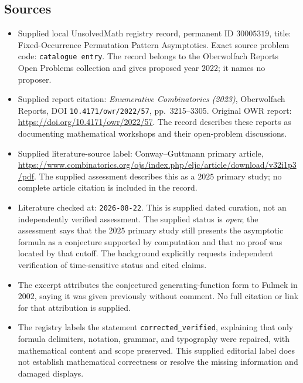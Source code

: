\documentclass[11pt]{article}
\begin{document}
\subsection{Sources}
\begin{itemize}
\item Supplied local UnsolvedMath registry record, permanent ID \(30005319\), title: Fixed-Occurrence Permutation Pattern Asymptotics. Exact source problem code: \texttt{catalogue entry}. The record belongs to the Oberwolfach Reports Open Problems collection and gives proposed year \(2022\); it names no proposer.
\item Supplied report citation: \emph{Enumerative Combinatorics (2023)}, Oberwolfach Reports, DOI \texttt{10.4171/owr/2022/57}, pp.\ 3215--3305. Original OWR report: \url{https://doi.org/10.4171/owr/2022/57}. The record describes these reports as documenting mathematical workshops and their open-problem discussions.
\item Supplied literature-source label: Conway--Guttmann primary article, \url{https://www.combinatorics.org/ojs/index.php/eljc/article/download/v32i1p3/pdf}. The supplied assessment describes this as a \(2025\) primary study; no complete article citation is included in the record.
\item Literature checked at: \texttt{2026-08-22}. This is supplied dated curation, not an independently verified assessment. The supplied status is \emph{open}; the assessment says that the \(2025\) primary study still presents the asymptotic formula as a conjecture supported by computation and that no proof was located by that cutoff. The background explicitly requests independent verification of time-sensitive status and cited claims.
\item The excerpt attributes the conjectured generating-function form to Fulmek in \(2002\), saying it was given previously without comment. No full citation or link for that attribution is supplied.
\item The registry labels the statement \texttt{corrected\_verified}, explaining that only formula delimiters, notation, grammar, and typography were repaired, with mathematical content and scope preserved. This supplied editorial label does not establish mathematical correctness or resolve the missing information and damaged displays.
\end{itemize}
\end{document}
